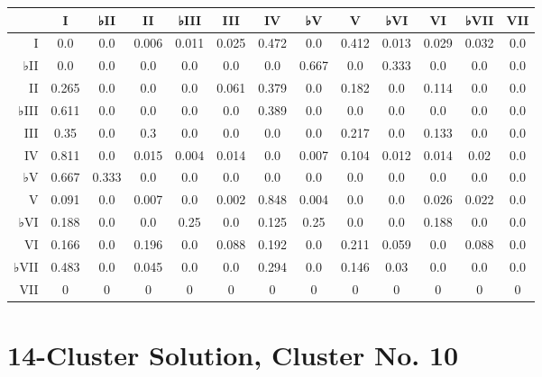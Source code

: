 \begin{table}[htbp]
\begin{minipage}{\linewidth}
\setlength{\tymax}{0.5\linewidth}
\centering
\small
\begin{tabulary}{\textwidth}{@{}RCCCCCCCCCCCC@{}} \toprule
&I&♭II&II&♭III&III&IV&♭V&V&♭VI&VI&♭VII&VII\\
\midrule
I&0.0&0.0&0.006&0.011&0.025&0.472&0.0&0.412&0.013&0.029&0.032&0.0\\
♭II&0.0&0.0&0.0&0.0&0.0&0.0&0.667&0.0&0.333&0.0&0.0&0.0\\
II&0.265&0.0&0.0&0.0&0.061&0.379&0.0&0.182&0.0&0.114&0.0&0.0\\
♭III&0.611&0.0&0.0&0.0&0.0&0.389&0.0&0.0&0.0&0.0&0.0&0.0\\
III&0.35&0.0&0.3&0.0&0.0&0.0&0.0&0.217&0.0&0.133&0.0&0.0\\
IV&0.811&0.0&0.015&0.004&0.014&0.0&0.007&0.104&0.012&0.014&0.02&0.0\\
♭V&0.667&0.333&0.0&0.0&0.0&0.0&0.0&0.0&0.0&0.0&0.0&0.0\\
V&0.091&0.0&0.007&0.0&0.002&0.848&0.004&0.0&0.0&0.026&0.022&0.0\\
♭VI&0.188&0.0&0.0&0.25&0.0&0.125&0.25&0.0&0.0&0.188&0.0&0.0\\
VI&0.166&0.0&0.196&0.0&0.088&0.192&0.0&0.211&0.059&0.0&0.088&0.0\\
♭VII&0.483&0.0&0.045&0.0&0.0&0.294&0.0&0.146&0.03&0.0&0.0&0.0\\
VII&0&0&0&0&0&0&0&0&0&0&0&0\\

\bottomrule

\end{tabulary}
\end{minipage}
\end{table}

\section{14-Cluster Solution, Cluster No. 10}
\label{14-clustersolutionclusterno.10}


